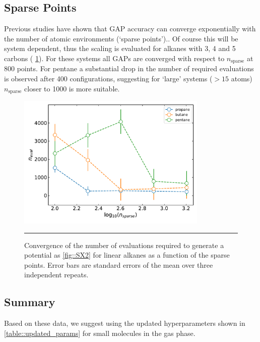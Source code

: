 \documentclass[11pt]{article}
\numberwithin{equation}{subsection}
\begin{document}
\newpage
\subsection{Sparse Points}

Previous studies have shown that GAP accuracy can converge exponentially with the number of atomic environments (`sparse points').\cite{Rowe2020}. Of course this will be system dependent, thus the scaling is evaluated for alkanes with 3, 4 and 5 carbons (\figurename{ \ref{fig::SX21}}). For these systems all GAPs are converged with respect to $n_\text{sparse}$ at 800 points. For pentane a substantial drop in the number of required evaluations is observed after 400 configurations, suggesting for `large' systems ($>15$ atoms) $n_\text{sparse}$ closer to 1000 is more suitable.


\begin{figure}[h!]
	\centering
	\includegraphics[height=6.4cm]{figSX21.pdf}
	\vspace{0.1cm}
	\hrule
	\vspace{0.1cm}
	\caption{Convergence of the number of evaluations required to generate a potential as \figurename{ \ref{fig::SX2}} for linear alkanes as a function of the sparse points. Error bars are standard errors of the mean over three independent repeats.}
	\label{fig::SX21}
\end{figure}


\subsection{Summary}  \label{section::SI_hyperparam_opt_summary}

Based on these data, we suggest using the updated hyperparameters shown in \tablename{ \ref{table::updated_params}} for small molecules in the gas phase.
\end{document}
